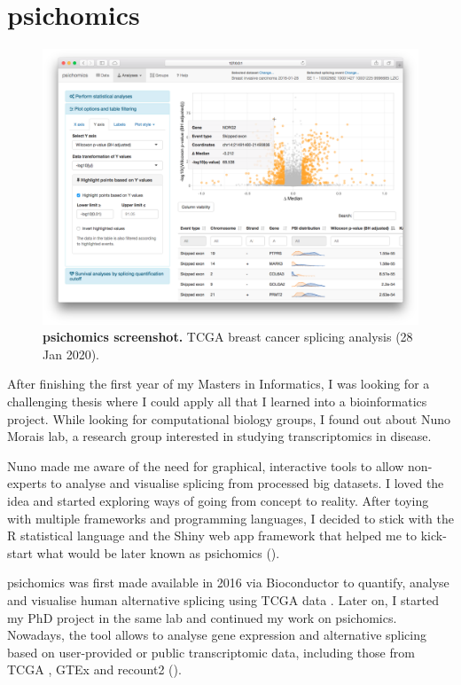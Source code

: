 \chapter{psichomics}

\begin{figure}[!b]
  \vspace*{-.5cm}
  \includegraphics[width=.93\textwidth]{images/psichomics/screenshot}
  \centering
  \vspace*{-.5cm}
  \caption[psichomics screenshot]{\textbf{psichomics screenshot.} TCGA breast cancer splicing analysis (28 Jan 2020).}
  \label{fig:psichomics-screenshot}
\end{figure}

After finishing the first year of my Masters in Informatics, I was looking for a challenging thesis where I could apply all that I learned into a bioinformatics project. While looking for computational biology groups, I found out about Nuno Morais lab, a research group interested in studying transcriptomics in disease.

Nuno made me aware of the need for graphical, interactive tools to allow non-experts to analyse and visualise splicing from processed big datasets. I loved the idea and started exploring ways of going from concept to reality. After toying with multiple frameworks and programming languages, I decided to stick with the R statistical language and the Shiny web app framework \cite{chang:2021ul} that helped me to kick-start what would be later known as psichomics ().

psichomics was first made available in 2016 via Bioconductor to quantify, analyse and visualise human alternative splicing using TCGA data \cite{chang:2013ww}. Later on, I started my PhD project in the same lab and continued my work on psichomics. Nowadays, the tool allows to analyse gene expression and alternative splicing based on user-provided or public transcriptomic data, including those from TCGA \cite{chang:2013ww}, GTEx \cite{lonsdale:2013uo} and recount2 \cite{collado-torres:2017uw} ().

